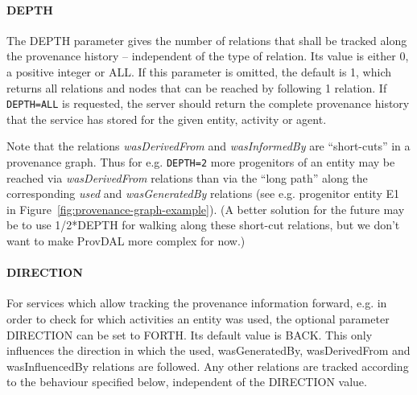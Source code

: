 
\paragraph{{DEPTH}}
The DEPTH parameter gives the number of relations that shall be tracked along
the provenance history -- independent of the type of relation. Its value is
either 0, a positive integer or ALL. If this parameter is omitted,
the default is 1, which returns all relations and nodes that can be reached
by following 1 relation. If \texttt{DEPTH=ALL} is requested, the server should
return the complete provenance history that the service has stored for the
given entity, activity or agent. 


Note that the relations \emph{wasDerivedFrom} and \emph{wasInformedBy} are ``short-cuts''
in a provenance graph. Thus for e.g. \texttt{DEPTH=2} more progenitors of an entity may
be reached via \emph{wasDerivedFrom} relations than via the ``long path'' along the
corresponding \emph{used} and \emph{wasGeneratedBy} relations (see e.g. progenitor entity E1 in
Figure~\ref{fig:provenance-graph-example}).
(A better solution for the future may be to use 1/2*DEPTH for walking along these short-cut relations, but we don't want to make ProvDAL more complex for now.)


\paragraph{DIRECTION}
For services which allow tracking the provenance information forward, e.g. in order to check for which activities an entity was used, the optional parameter DIRECTION can be set to FORTH. Its default value is BACK. This only influences the direction in which the used, wasGeneratedBy, wasDerivedFrom and wasInfluencedBy relations are followed. Any other relations are tracked according to the behaviour specified below, independent of the DIRECTION value.

